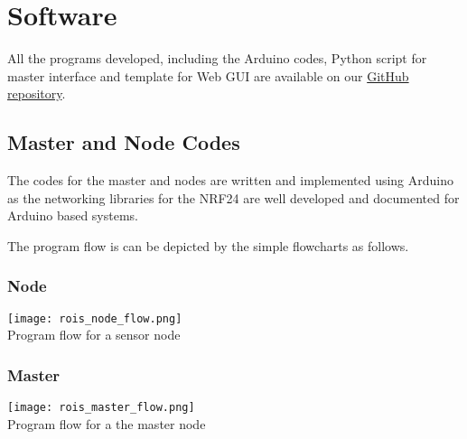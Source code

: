 \chapter{Software}

All the programs developed, including the Arduino codes, Python script for master interface and template for Web GUI  are available on our \href{https://github.com/Nabla33/Room_Occupancy_Indicating_Network}{GitHub repository}\cite{github}.

\section{Master and Node Codes}

The codes for the master and nodes are written and implemented using Arduino as the networking libraries for the NRF24 are well developed and documented for Arduino based systems.

The program flow is can be depicted by the simple flowcharts as follows.

\subsection{Node}

\begin{center}
	\texttt{[image: rois\_node\_flow.png]}\\		
	\vspace{10pt}
	Program flow for a sensor node
	
\end{center}

\subsection{Master}

\begin{center}
	\texttt{[image: rois\_master\_flow.png]}\\		
	\vspace{10pt}
	Program flow for a the master node
	
\end{center}